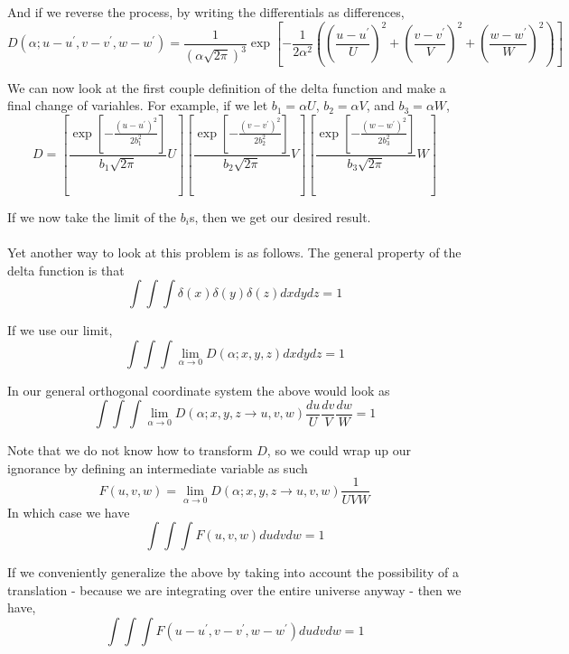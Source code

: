 And if we reverse the process, by writing the differentials as differences,
$$
D\left(\alpha ; u-u^\prime, v-v^\prime, w-w^\prime \right) =
    \frac{1}{\left(\alpha \sqrt{2\pi}\right)^3}
    \exp{ \left[ -\frac{1}{2\alpha^2} \left(
        \left(\frac{u-u^\prime}{U}\right)^2 + \left(\frac{v-v^\prime}{V}\right)^2 + \left(\frac{w-w^\prime}{W}\right)^2 \right) 
    \right] }
$$

We can now look at the first couple definition of the delta function and make a final change of variahles.
For example, if we let $b_1 = \alpha U$, $b_2 = \alpha V$, and $b_3 = \alpha W$,
$$
D =
    \left[ \frac{
            \exp{ \left[ -\frac{
                \left(u-u^\prime\right)^2
            }{2b_{1}^{2}}  \right] }
        }{b_1 \sqrt{2\pi}}
        U
     \right]
     \left[ \frac{
            \exp{ \left[ -\frac{
                \left(v-v^\prime\right)^2
            }{2b_{2}^{2}}  \right] }
        }{b_2 \sqrt{2\pi}}
        V
     \right]
     \left[ \frac{
            \exp{ \left[ -\frac{
                \left(w-w^\prime\right)^2
            }{2b_{3}^{2}}  \right] }
        }{b_3 \sqrt{2\pi}}
        W
     \right]
$$

If we now take the limit of the $b_i$s, then we get our desired result.
\\~\\

Yet another way to look at this problem is as follows.
The general property of the delta function is that
$$
\int \int \int \delta(x) \delta(y) \delta(z) dx dy dz = 1
$$

If we use our limit,
$$
\int \int \int \lim_{\alpha\rightarrow 0} D(\alpha; x, y, z) dx dy dz = 1
$$

In our general orthogonal coordinate system the above would look as
$$
\int \int \int \lim_{\alpha\rightarrow 0} D(\alpha; x, y, z \rightarrow u, v, w) \frac{du}{U} \frac{dv}{V} \frac{dw}{W} = 1
$$

Note that we do not know how to transform $D$, so we could wrap up our ignorance by defining an intermediate variable as such
$$
F(u,v,w) = \lim_{\alpha\rightarrow 0} D(\alpha; x, y, z \rightarrow u, v, w) \frac{1}{UVW}
$$
In which case we have
$$
\int \int \int F(u,v,w) du dv dw = 1
$$

If we conveniently generalize the above by taking into account the possibility of a translation - because we are integrating over
the entire universe anyway - then we have,
$$
\int \int \int F(u-u^\prime, v-v^\prime, w-w^\prime) du dv dw = 1
$$

